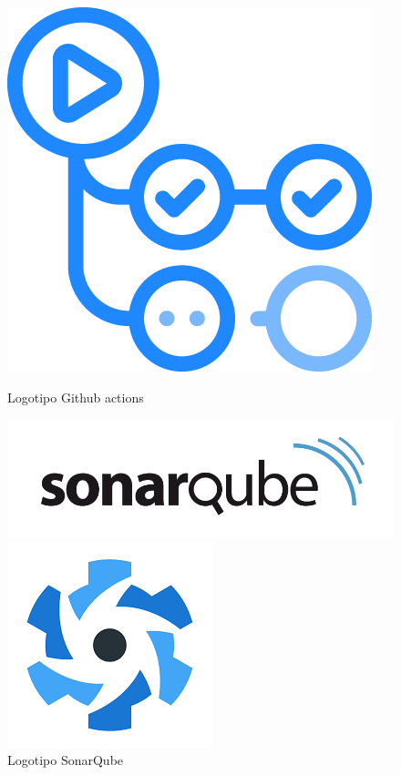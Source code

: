 \documentclass[11pt,spanish,listoffigures,listoftables]{tfgetsinf}
\begin{document}
\begin{figure}[!htb]
     \includegraphics[width=\linewidth]{img/GithubActions-logo.png}
     \caption{Logotipo Github actions}\label{fig:LogoGithub}
   \endminipage\hfill
     \includegraphics[width=\linewidth]{img/SonarQube_logo.png}
     \caption{Logotipo SonarQube}\label{fig:LogoSonarQube}
   \endminipage\hfill
     \includegraphics[width=\linewidth]{img/Quasar_logo.png}

\end{figure}
\end{document}
